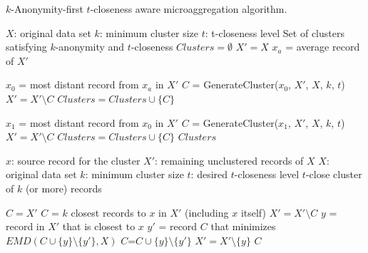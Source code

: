 \documentclass[10pt,journal,compsoc]{IEEEtran}
\theoremstyle{definition}
\theoremstyle{plain}
\begin{document}
\begin{algorithm}
	\protect\caption{\label{alg:k-anonymity-first}$k$-Anonymity-first $t$-closeness aware microaggregation algorithm.}
	
	\begin{algorithmic}[0]
			 $X$: original data set
			\State \hspace{1.11cm}$k$: minimum cluster size
			\State \hspace{1.11cm}$t$: t-closeness level
			 Set of clusters satisfying $k$-anonymity and $t$-closeness
			\vspace{0.3cm}
			\State $Clusters = \emptyset$
			\State $X' = X$
				\State$x_a$ = average record of $X'$
				
				\State$x_0$ = most distant record from $x_a$ in $X'$
				\State$C$ = GenerateCluster($x_0$, $X'$, $X$, $k$, $t$)
				\State$X'=X'\setminus C$
				\State$Clusters = Clusters \cup \{C\}$
				
					\State$x_1$ = most distant record from $x_0$ in $X'$
					\State$C$ = GenerateCluster($x_1$, $X'$, $X$, $k$, $t$)
					\State$X'=X'\setminus C$
					\State$Clusters = Clusters \cup \{C\}$
				\EndIf
			\EndWhile
		 $Clusters$
		\EndFunction
		
			 $x$: source record for the cluster
			\State \hspace{1.11cm}	$X'$: remaining unclustered records of $X$
			\State \hspace{1.11cm}	$X$: original data set
			\State \hspace{1.11cm}	$k$: minimum cluster size
			\State \hspace{1.11cm}	$t$: desired $t$-closeness level
			 $t$-close cluster of $k$ (or more) records
			
				\State $C = X'$
			\Else
				\State $C$ = $k$ closest records to $x$ in $X'$ (including $x$ itself)
				\State $X'=X'\setminus C$
					\State $y$ = record in $X'$ that is closest to $x$
					\State $y'$ = record $C$ that minimizes $EMD(C\cup\{y\}\setminus\{y'\},X)$
						\State $C$=$C\cup\{y\}\setminus\{y'\}$
					\EndIf
					\State $X'=X'\setminus\{y\}$
				\EndWhile
			\EndIf
			 $C$
		\EndFunction
		
	\end{algorithmic}
	
	
\end{algorithm}
\end{document}

